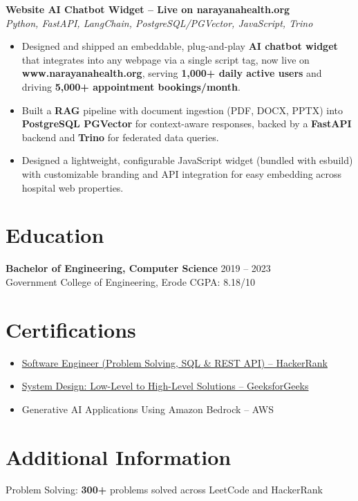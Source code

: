 \documentclass[10pt,letterpaper]{article}
\newcommand{\weblink}[2]{\href{#1}{#2}}
\newcommand{\role}[2]{\textbf{#1} \hfill #2\\[-3pt]}
\newcommand{\projtitle}[2]{\textbf{#1} \\[-1pt] \textit{#2}\\[-3pt]}
\begin{document}
\projtitle{Website AI Chatbot Widget -- Live on narayanahealth.org}{Python, FastAPI, LangChain, PostgreSQL/PGVector, JavaScript, Trino}
\begin{itemize}
\item Designed and shipped an embeddable, plug-and-play \textbf{AI chatbot widget} that integrates into any webpage via a single script tag, now live on \textbf{www.narayanahealth.org}, serving \textbf{1,000+ daily active users} and driving \textbf{5,000+ appointment bookings/month}.
\item Built a \textbf{RAG} pipeline with document ingestion (PDF, DOCX, PPTX) into \textbf{PostgreSQL PGVector} for context-aware responses, backed by a \textbf{FastAPI} backend and \textbf{Trino} for federated data queries.
\item Designed a lightweight, configurable JavaScript widget (bundled with esbuild) with customizable branding and API integration for easy embedding across hospital web properties.
\end{itemize}

\section*{Education}
\role{Bachelor of Engineering, Computer Science}{2019 -- 2023}
Government College of Engineering, Erode \hfill CGPA: 8.18/10

\section*{Certifications}
\begin{itemize}
\item \weblink{https://www.hackerrank.com/certificates/77109dd85399}{Software Engineer (Problem Solving, SQL \& REST API) -- HackerRank}
\item \weblink{https://media.geeksforgeeks.org/courses/certificates/ddc8b59cc39eea59552c001b68ebfd2b.pdf}{System Design: Low-Level to High-Level Solutions -- GeeksforGeeks}
\item Generative AI Applications Using Amazon Bedrock -- AWS
\end{itemize}

\section*{Additional Information}
Problem Solving: \textbf{300+} problems solved across LeetCode and HackerRank
\end{document}
